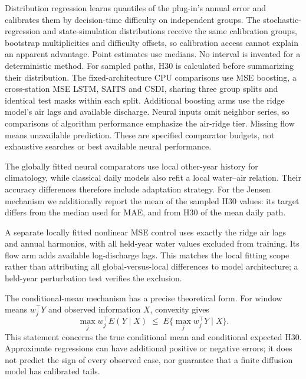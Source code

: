 \documentclass[draft,linenumbers]{agujournal2025}
\begin{document}
Distribution regression learns quantiles of the plug-in's annual error and calibrates them by decision-time difficulty on independent groups. The stochastic-regression and state-simulation distributions receive the same calibration groups, bootstrap multiplicities and difficulty offsets, so calibration access cannot explain an apparent advantage. Point estimates use medians. No interval is invented for a deterministic method. For sampled paths, H30 is calculated before summarizing their distribution. The fixed-architecture CPU comparisons use MSE boosting, a cross-station MSE LSTM, SAITS and CSDI, sharing three group splits and identical test masks within each split. Additional boosting arms use the ridge model's air lags and available discharge. Neural inputs omit neighbor series, so comparisons of algorithm performance emphasize the air-ridge tier. Missing flow means unavailable prediction. These are specified comparator budgets, not exhaustive searches or best available neural performance.

The globally fitted neural comparators use local other-year history for climatology, while classical daily models also refit a local water--air relation. Their accuracy differences therefore include adaptation strategy. For the Jensen mechanism we additionally report the mean of the sampled H30 values: its target differs from the median used for MAE, and from H30 of the mean daily path.

A separate locally fitted nonlinear MSE control uses exactly the ridge air lags and annual harmonics, with all held-year water values excluded from training. Its flow arm adds available log-discharge lags. This matches the local fitting scope rather than attributing all global-versus-local differences to model architecture; a held-year perturbation test verifies the exclusion.

The conditional-mean mechanism has a precise theoretical form. For window means $w_j^\top Y$ and observed information $X$, convexity gives
\begin{equation}
\max_j w_j^\top E(Y\mid X)\;\leq\;E\{\max_j w_j^\top Y\mid X\}.
\end{equation}
This statement concerns the true conditional mean and conditional expected H30. Approximate regressions can have additional positive or negative errors; it does not predict the sign of every observed case, nor guarantee that a finite diffusion model has calibrated tails.
\end{document}
